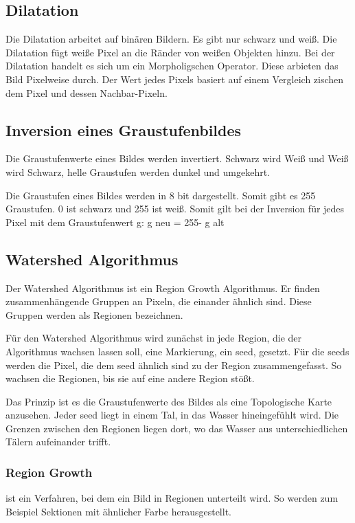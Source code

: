 \documentclass[german,a4paper, 12pt]{llncs}
\begin{document}
\subsection{Dilatation}
Die Dilatation arbeitet auf binären Bildern. Es gibt nur schwarz und weiß.
Die Dilatation fügt weiße Pixel an die Ränder von weißen Objekten hinzu. 
Bei der Dilatation handelt es sich um ein Morpholigschen Operator. Diese arbieten das Bild Pixelweise durch. Der Wert jedes Pixels basiert auf einem Vergleich zischen dem Pixel und dessen Nachbar-Pixeln.\cite{DilationCV}
	
\subsection{Inversion eines Graustufenbildes}

Die Graustufenwerte eines Bildes werden invertiert. 
Schwarz wird Weiß und Weiß wird Schwarz, helle Graustufen werden dunkel und umgekehrt.
 
Die Graustufen eines Bildes werden in 8 bit dargestellt. Somit gibt es 255 Graustufen. 0 ist schwarz und 255 ist weiß. 
Somit gilt bei der Inversion für jedes Pixel mit dem Graustufenwert g:
g neu = 255- g alt 

\subsection{Watershed Algorithmus}

Der Watershed Algorithmus ist ein Region Growth Algorithmus. Er finden zusammenhängende Gruppen an Pixeln, die einander ähnlich sind. Diese Gruppen werden als Regionen bezeichnen. 

Für den Watershed Algorithmus wird zunächst in jede Region, die der Algorithmus wachsen lassen soll, eine Markierung, ein seed, gesetzt.
Für die seeds werden die Pixel, die dem seed ähnlich sind zu der Region zusammengefasst. So wachsen die Regionen, bis sie auf eine andere Region stößt.

Das Prinzip ist es die Graustufenwerte des Bildes als eine Topologische Karte anzusehen. Jeder seed liegt in einem Tal, in das Wasser hineingefühlt wird. 
Die Grenzen zwischen den Regionen liegen dort, wo das Wasser aus unterschiedlichen Tälern aufeinander trifft.\cite{Watershed,WatershedCV} 

\subsubsection{Region Growth}
ist ein Verfahren, bei dem ein Bild in Regionen unterteilt wird. So werden zum Beispiel Sektionen mit ähnlicher Farbe herausgestellt.
\end{document}
